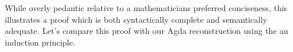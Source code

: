 While overly pedantic relative to a mathematicians preferred conciseness,
this illustrates a proof which is both syntactically complete and semantically
adequate. Let's compare this proof with our Agda reconstruction using
the an induction principle.

\begin{code}%
\>[0]\AgdaSpace{}%
\AgdaSymbol{:}\AgdaSpace{}%
\AgdaSymbol{(}\AgdaSpace{}%
\AgdaSpace{}%
\AgdaSpace{}%
\AgdaSymbol{:}\AgdaSpace{}%
\AgdaSymbol{)}\AgdaSpace{}%
\AgdaSpace{}%
\AgdaSymbol{((}\AgdaSpace{}%
\AgdaOperator{\AgdaFunction{+}}\AgdaSpace{}%
\AgdaSymbol{)}\AgdaSpace{}%
\AgdaOperator{\AgdaFunction{+}}\AgdaSpace{}%
\AgdaSymbol{)}\AgdaSpace{}%
\AgdaSpace{}%
\AgdaSymbol{(}\AgdaSpace{}%
\AgdaOperator{\AgdaFunction{+}}\AgdaSpace{}%
\AgdaSymbol{(}\AgdaSpace{}%
\AgdaOperator{\AgdaFunction{+}}\AgdaSpace{}%
\AgdaSymbol{))}\<%
\\
\>[0]\AgdaSpace{}%
\AgdaSpace{}%
\AgdaSpace{}%
\AgdaSpace{}%
\AgdaSymbol{=}\AgdaSpace{}%
\AgdaSpace{}%
\AgdaSpace{}%
\AgdaSpace{}%
\AgdaSpace{}%
\AgdaSpace{}%
\AgdaSpace{}%
\AgdaSpace{}%
\AgdaSpace{}%
\AgdaSymbol{(}\AgdaSpace{}%
\AgdaSpace{}%
\AgdaSymbol{))}\AgdaSpace{}%
\<%
\\
\>[0][@{}l@{\AgdaIndent{0}}]%
\>[2]\<%
\\
\>[2][@{}l@{\AgdaIndent{0}}]%
\>[4]\AgdaSpace{}%
\AgdaSymbol{:}\AgdaSpace{}%
\AgdaSymbol{(}\AgdaSpace{}%
\AgdaOperator{\AgdaFunction{+}}\AgdaSpace{}%
\AgdaSpace{}%
\AgdaOperator{\AgdaFunction{+}}\AgdaSpace{}%
\AgdaSymbol{)}\AgdaSpace{}%
\AgdaSpace{}%
\AgdaSymbol{(}\AgdaSpace{}%
\AgdaOperator{\AgdaFunction{+}}\AgdaSpace{}%
\AgdaSymbol{(}\AgdaSpace{}%
\AgdaOperator{\AgdaFunction{+}}\AgdaSpace{}%
\AgdaSymbol{))}\<%
\\
%
\>[4]\AgdaSpace{}%
\AgdaSymbol{=}\AgdaSpace{}%
\<%
\\

\end{code}

